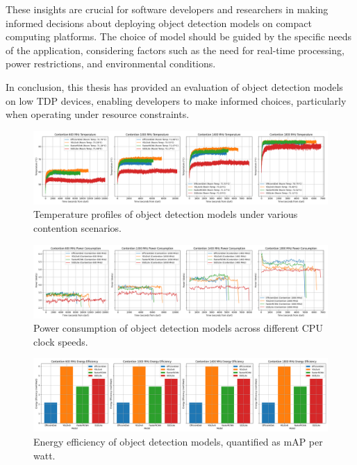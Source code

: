 \documentclass[10pt,twocolumn,letterpaper]{article}
\begin{document}
These insights are crucial for software developers and researchers in making informed decisions about deploying object detection models on compact computing platforms. The choice of model should be guided by the specific needs of the application, considering factors such as the need for real-time processing, power restrictions, and environmental conditions.

In conclusion, this thesis has provided an evaluation of object detection models on low TDP devices, enabling developers to make informed choices, particularly when operating under resource constraints.

{\small
%


}

\appendix

\begin{figure}[t]
  \centering
  \includegraphics[width=1\linewidth]{images/temperature_plot.png}
  \caption{Temperature profiles of object detection models under various contention scenarios.}
  \label{fig:temperature_profiles}
\end{figure}

\begin{figure}[t]
  \centering
  \includegraphics[width=1\linewidth]{images/power_consumption.png}
  \caption{Power consumption of object detection models across different CPU clock speeds.}
  \label{fig:power_consumption}
\end{figure}

\begin{figure}[t]
  \centering
  \includegraphics[width=1\linewidth]{images/energy_efficiency.png}
  \caption{Energy efficiency of object detection models, quantified as mAP per watt.}
  \label{fig:energy_efficiency}
\end{figure}
\end{document}
